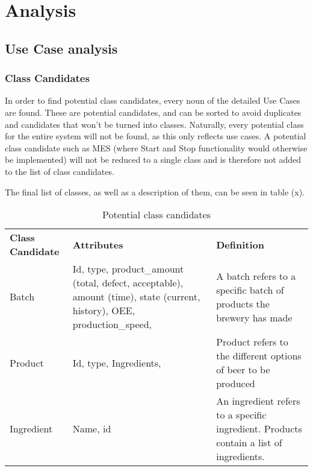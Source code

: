 \section{Analysis}

\subsection{Use Case analysis}

\subsubsection{Class Candidates}
In order to find potential class candidates, every noun of the detailed Use Cases are found.
These are potential candidates, and can be sorted to avoid duplicates and candidates that 
won’t be turned into classes. Naturally, every potential class for the entire system will 
not be found, as this only reflects use cases. A potential class candidate such as MES 
(where Start and Stop functionality would otherwise be implemented) will not be reduced to 
a single class and is therefore not added to the list of class candidates.

The final list of classes, as well as a description of them, can be seen in table (x).

\begin{table}[]
\begin{tabular}{lll}
\textbf{Class Candidate} & \textbf{Attributes}                                                                                                     & \textbf{Definition}                                                                    \\
Batch                    & Id, type, product\_amount (total, defect, acceptable), amount (time), state (current, history), OEE, production\_speed, & A batch refers to a specific batch of products the brewery has made                    \\
Product                  & Id, type, Ingredients,                                                                                                  & Product refers to the different options of beer to be produced                         \\
Ingredient               & Name, id                                                                                                                & An ingredient refers to a specific ingredient. Products contain a list of ingredients.
\end{tabular}
\caption{Potential class candidates}
\label{table:class_candidates}
\end{table}

